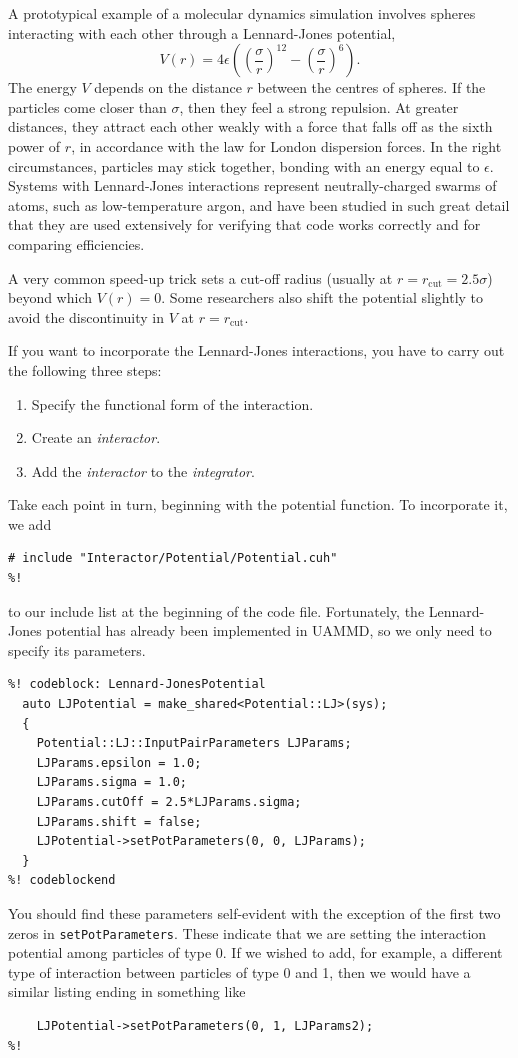 A prototypical example of a molecular dynamics simulation involves spheres 
interacting with each other through a Lennard-Jones potential,
\begin{equation*}
  V(r) = 4\epsilon\left(\left(\frac{\sigma}{r}\right)^{12}
                        - \left(\frac{\sigma}{r}\right)^6\right). 
\end{equation*}
The energy $V$ depends on the distance $r$ between the centres of spheres. If 
the particles come closer than $\sigma$, then they feel a strong repulsion. At
greater distances, they attract each other weakly with a force that falls off
as the sixth power of $r$, in accordance with the law for London dispersion
forces. In the right circumstances, particles may stick together, bonding with
an energy equal to $\epsilon$. Systems with Lennard-Jones interactions represent
neutrally-charged swarms of atoms, such as low-temperature argon, and have been
studied in such great detail that they are used extensively for verifying that
code works correctly and for comparing efficiencies.

A very common speed-up trick sets a cut-off radius (usually at
$r = r_{\mathrm{cut}} = 2.5 \sigma$) beyond which $V(r) = 0$. Some researchers
also shift the potential slightly to avoid the discontinuity in $V$ at
$r = r_{\mathrm{cut}}$.

If you want to incorporate the Lennard-Jones interactions, you have to carry out 
the following three steps:
\begin{enumerate}
  \item Specify the functional form of the interaction.
  \item Create an \textit{interactor}.
  \item Add the \textit{interactor} to the \textit{integrator}.
\end{enumerate}

Take each point in turn, beginning with the potential function. To incorporate
it, we add
\begin{lstlisting}
# include "Interactor/Potential/Potential.cuh"
%!
\end{lstlisting}
to our include list at the beginning of the code file. Fortunately, the
Lennard-Jones potential has already been implemented in UAMMD, so we
only need to specify its parameters.
\begin{lstlisting}
%! codeblock: Lennard-JonesPotential
  auto LJPotential = make_shared<Potential::LJ>(sys);
  {
    Potential::LJ::InputPairParameters LJParams;
    LJParams.epsilon = 1.0;
    LJParams.sigma = 1.0;
    LJParams.cutOff = 2.5*LJParams.sigma;
    LJParams.shift = false;
    LJPotential->setPotParameters(0, 0, LJParams);
  }
%! codeblockend
\end{lstlisting}
You should find these parameters self-evident with the exception of the first
two zeros in \texttt{setPotParameters}. These indicate that we are setting the
interaction potential among particles of type 0. If we wished to add, for
example, a different type of interaction between particles of type 0 and 1,
then we would have a similar listing ending in something like
\begin{lstlisting}
    LJPotential->setPotParameters(0, 1, LJParams2);
%!
\end{lstlisting}

